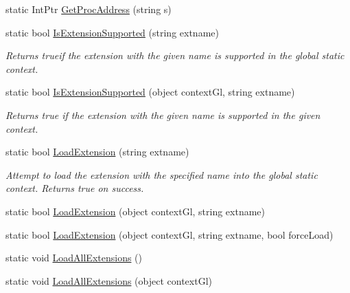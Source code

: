 \begin{DoxyCompactItemize}
\item 
static IntPtr \hyperlink{class_tao_1_1_open_gl_1_1_gl_extension_loader_a8bf7f068f8a7be37ffbdc65c4ba98986}{GetProcAddress} (string s)
\item 
static bool \hyperlink{class_tao_1_1_open_gl_1_1_gl_extension_loader_a9434f150011308b0f7146fa7f64b4df8}{IsExtensionSupported} (string extname)
\begin{DoxyCompactList}\small\item\em Returns trueif the extension with the given name is supported in the global static context. \item\end{DoxyCompactList}\item 
static bool \hyperlink{class_tao_1_1_open_gl_1_1_gl_extension_loader_a0ec064787afd7b4aded0a1af599bd5cb}{IsExtensionSupported} (object contextGl, string extname)
\begin{DoxyCompactList}\small\item\em Returns true if the extension with the given name is supported in the given context. \item\end{DoxyCompactList}\item 
static bool \hyperlink{class_tao_1_1_open_gl_1_1_gl_extension_loader_a31ecd0e82681e2de1b883a7017582247}{LoadExtension} (string extname)
\begin{DoxyCompactList}\small\item\em Attempt to load the extension with the specified name into the global static context. Returns true on success. \item\end{DoxyCompactList}\item 
static bool \hyperlink{class_tao_1_1_open_gl_1_1_gl_extension_loader_a831ac2db930dd10abbac544c92a01361}{LoadExtension} (object contextGl, string extname)
\item 
static bool \hyperlink{class_tao_1_1_open_gl_1_1_gl_extension_loader_a5e8ca40f3a0fdbc1b292be3672f5d57e}{LoadExtension} (object contextGl, string extname, bool forceLoad)
\item 
static void \hyperlink{class_tao_1_1_open_gl_1_1_gl_extension_loader_a629c10c38cc4498b99e8a4d657b7be27}{LoadAllExtensions} ()
\item 
static void \hyperlink{class_tao_1_1_open_gl_1_1_gl_extension_loader_a3bf159a347252c7c98d74a8b5e79d1b5}{LoadAllExtensions} (object contextGl)
\end{DoxyCompactItemize}


